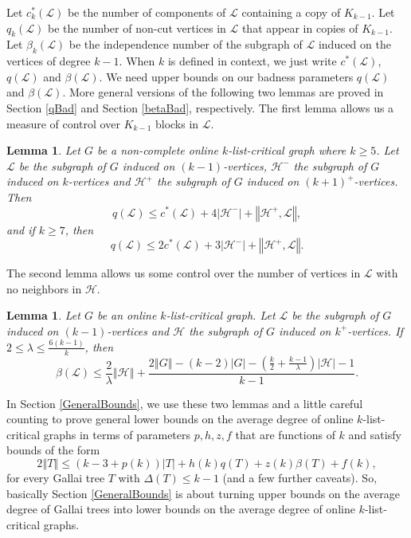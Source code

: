 \documentclass[12pt]{article}
\theoremstyle{plain}
\newtheorem{lem}[thm]{Lemma}
\theoremstyle{definition}
\theoremstyle{remark}
\newcommand{\fancy}[1]{\mathcal{#1}}
\renewcommand{\L}{\fancy{L}}
\newcommand{\HH}{\fancy{H}}
\newcommand{\card}[1]{\left|#1\right|}
\newcommand{\size}[1]{\left\Vert#1\right\Vert}
\newcommand{\parens}[1]{\left( #1 \right)}
\begin{document}
Let $c_k^*(\L)$ be the number of components of $\L$ containing a copy of $K_{k-1}$. Let $q_k(\L)$ be the number of non-cut vertices in $\L$ that appear in copies of $K_{k-1}$.  
Let $\beta_k(\L)$ be the independence number of the subgraph of $\L$ induced on the vertices of degree $k-1$.  
When $k$ is defined in context, we just write $c^*(\L)$, $q(\L)$ and $\beta(\L)$.  
We need upper bounds on our badness parameters $q(\L)$ and $\beta(\L)$.  More general versions of the following two lemmas are proved in Section \ref{qBad} and Section \ref{betaBad},
respectively.  The first lemma allows us a measure of control over $K_{k-1}$ blocks in $\L$.

\begin{lem}\label{qLemmaList}
	Let $G$ be a non-complete online $k$-list-critical graph where $k \ge 5$.  Let $\L$ be the subgraph of $G$ induced on $(k-1)$-vertices, $\HH^-$ the subgraph of $G$ induced on $k$-vertices
	and $\HH^+$ the subgraph of $G$ induced on $(k+1)^+$-vertices.  Then
	\[q(\L) \le c^*(\L) + 4\card{\HH^-} + \size{\HH^+, \L},\] and if $k \ge 7$, then
	\[q(\L) \le 2c^*(\L) + 3\card{\HH^-} + \size{\HH^+, \L}.\]
\end{lem}

The second lemma allows us some control over the number of vertices in $\L$ with no neighbors in $\HH$.

\begin{lem}\label{betaLemmaList}
	Let $G$ be an online $k$-list-critical graph.  Let $\L$ be the subgraph of $G$ induced on $(k-1)$-vertices and	$\HH$ the subgraph of $G$ induced on $k^+$-vertices.  
	If $2 \le \lambda \le \frac{6(k-1)}{k}$, then
	\[\beta(\L) \le \frac{2}{\lambda}\size{\HH} + \frac{2\size{G} - (k-2)\card{G} - \parens{\frac{k}{2} + \frac{k-1}{\lambda}}\card{\HH} - 1}{k-1}.\]
\end{lem}

In Section \ref{GeneralBounds}, we use these two lemmas and a little careful counting to prove general lower bounds on the average degree of online $k$-list-critical graphs in terms
of parameters $p,h,z,f$ that are functions of $k$ and satisfy bounds of the form
\[2\size{T} \le \parens{k-3 + p(k)}\card{T} + h(k)q(T) + z(k)\beta(T) + f(k),\]
for every Gallai tree $T$ with $\Delta(T) \le k-1$ (and a few further caveats).  So, basically Section \ref{GeneralBounds} is about turning upper bounds on the average degree of Gallai trees
into lower bounds on the average degree of online $k$-list-critical graphs.
\end{document}
